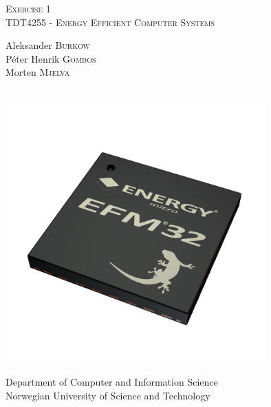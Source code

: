 \begin{titlepage}
  \begin{center}
    \huge
    \noindent\textsc{Exercise 1} \\
    \large
    \noindent\textsc{TDT4255 - Energy Efficient Computer Systems} \\ [2cm]
    \large

    \begin{minipage}{0.4\textwidth}
    \centering
      \noindent Aleksander \textsc{Burkow} \\
      \noindent Péter Henrik \textsc{Gombos} \\
      \noindent Morten \textsc{Mjelva} \\
    \end{minipage} \\[2cm]


    \includegraphics[width=0.75\textwidth]{figures/efm32}

    \vfill

    Department of Computer and Information Science \\
    Norwegian University of Science and Technology \\

  \end{center}
\end{titlepage}
